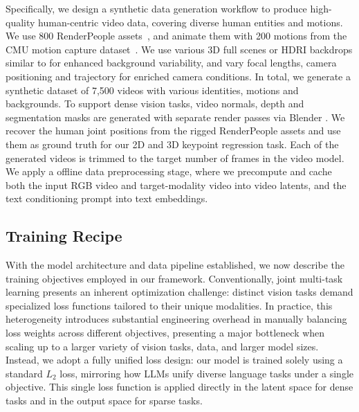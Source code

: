 \documentclass[11pt, a4paper, logo, onecolumn]{googledeepmind}
\begin{document}
Specifically, we design a synthetic data generation workflow to produce high-quality human-centric video data, covering diverse human entities and motions. We use 800 RenderPeople assets~\cite{Renderpeople.com}, and animate them with 200 motions from the CMU motion capture dataset~\cite{CMUmocap}. 
We use various 3D full scenes or HDRI backdrops similar to \cite{bazavan2022hspacesyntheticparametrichumans} for enhanced background variability, and vary focal lengths, camera positioning and trajectory for enriched camera conditions.
In total, we generate a synthetic dataset of 7,500 videos with various identities, motions and backgrounds. 
To support dense vision tasks, video normals, depth and segmentation masks are generated with separate render passes via Blender \cite{BlenderOnlineCommunity2025}. 
We recover the human joint positions from the rigged RenderPeople \cite{Renderpeople.com} assets and use them as ground truth for our 2D and 3D keypoint regression task. Each of the generated videos is trimmed to the target number of frames in the video model. 
We apply a offline data preprocessing stage, where we precompute and cache both the input RGB video and target-modality video into video latents, and the text conditioning prompt into text embeddings.






\subsection{Training Recipe}
\label{sec: training recipe}

With the model architecture and data pipeline established, we now describe the training objectives employed in our framework.
Conventionally, joint multi-task learning presents an inherent optimization challenge: distinct vision tasks demand specialized loss functions tailored to their unique modalities. 
In practice, this heterogeneity introduces substantial engineering overhead in manually balancing loss weights across different objectives, presenting a major bottleneck when scaling up to a larger variety of vision tasks, data, and larger model sizes. 
Instead, we adopt a fully unified loss design: 
our model is trained solely using a standard $L_2$ loss, mirroring how LLMs unify diverse language tasks under a single objective. This single loss function is applied directly in the latent space for dense tasks and in the output space for sparse tasks.
\end{document}
